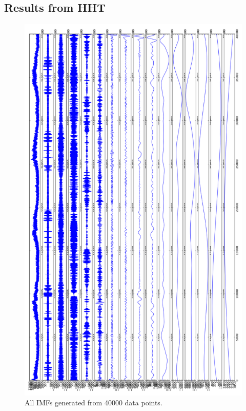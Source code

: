 \documentclass[12pt]{article}
\begin{document}
	\subsection{Results from HHT}
		\label{sec:resultshht}
		
		\begin{figure}[h]
			\centering
			\includegraphics[height = \textheight]{fullrun}
			\caption{All IMFs generated from 40000 data points.}
			\label{fig:fullrun}
		\end{figure}
		
\end{document}
